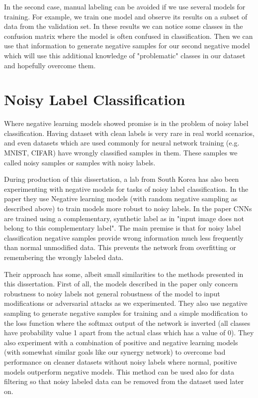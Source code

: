 \documentclass[b5paper]{book}
\let\cite\parencite
\begin{document}
In the second case, manual labeling can be avoided if we use several models for training. For example, we train one model and observe its results on a subset of data from the validation set. In these results we can notice some classes in the confusion matrix where the model is often confused in classification. Then we can use that information to generate negative samples for our second negative model which will use this additional knowledge of "problematic" classes in our dataset and hopefully overcome them.

\section{Noisy Label Classification}

Where negative learning models showed promise is in the problem of noisy label classification. Having dataset with clean labels is very rare in real world scenarios, and even datasets which are used commonly for neural network training (e.g. MNIST, CIFAR) have wrongly classified samples in them. These samples we called noisy samples or samples with noisy labels.

During production of this dissertation, a lab from South Korea has also been experimenting with negative models for tasks of noisy label classification. \cite{kim2019nlnl} In the paper they use Negative learning models (with random negative sampling as described above) to train models more robust to noisy labels. In the paper CNNs are trained using a complementary, synthetic label as in "input image does not belong to this complementary label". The main premise is that for noisy label classification negative samples provide wrong information much less frequently than normal unmodified data. This prevents the network from overfitting or remembering the wrongly labeled data.

Their approach has some, albeit small similarities to the methods presented in this dissertation. First of all, the models described in the paper only concern robustness to noisy labels not general robustness of the model to input modifications or adversarial attacks as we experimented. They also use negative sampling to generate negative samples for training and a simple modification to the loss function where the softmax output of the network is inverted (all classes have probability value 1 apart from the actual class which has a value of 0). They also experiment with a combination of positive and negative learning models (with somewhat similar goals like our synergy network) to overcome bad performance on cleaner datasets without noisy labels where normal, positive models outperform negative models. This method can be used also for data filtering so that noisy labeled data can be removed from the dataset used later on.
\end{document}
